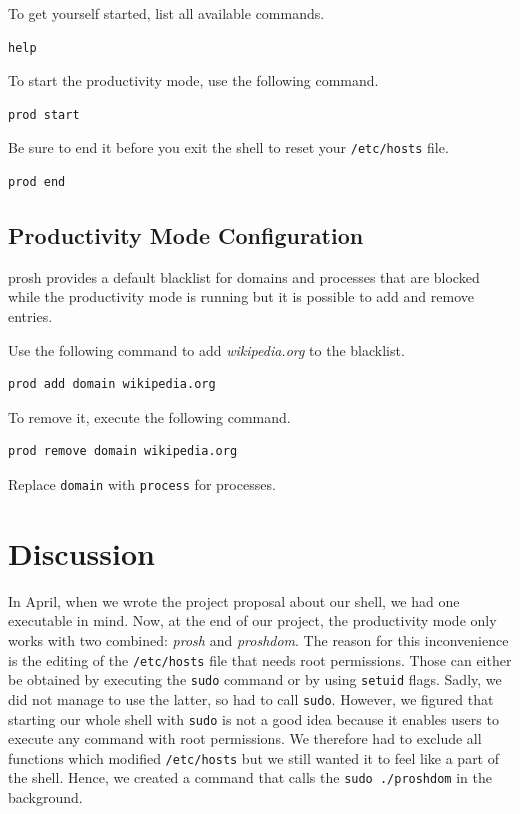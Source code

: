 \documentclass{article}
\begin{document}
To get yourself started, list all available commands.
\begin{lstlisting}[numbers=none]
help
\end{lstlisting}

To start the productivity mode, use the following command.
\begin{lstlisting}[numbers=none]
prod start
\end{lstlisting}

Be sure to end it before you exit the shell to reset your \texttt{/etc/hosts} file.
\begin{lstlisting}[numbers=none]
prod end
\end{lstlisting}

\subsection{Productivity Mode Configuration}

prosh provides a default blacklist for domains and processes that are blocked while the productivity mode is running but it is possible to add and remove entries.

Use the following command to add \textit{wikipedia.org} to the blacklist.
\begin{lstlisting}[numbers=none]
prod add domain wikipedia.org
\end{lstlisting}

To remove it, execute the following command.
\begin{lstlisting}[numbers=none]
prod remove domain wikipedia.org
\end{lstlisting}

Replace \texttt{domain} with \texttt{process} for processes.

\section{Discussion}

In April, when we wrote the project proposal about our shell, we had one executable in mind. Now, at the end of our project, the productivity mode only works with two combined: \textit{prosh} and \textit{proshdom}. The reason for this inconvenience is the editing of the \texttt{/etc/hosts} file that needs root permissions. Those can either be obtained by executing the  \texttt{sudo} command or by using \texttt{setuid} flags. Sadly, we did not manage to use the latter, so had to call \texttt{sudo}. However, we figured that starting our whole shell with \texttt{sudo} is not a good idea because it enables users to execute any command with root permissions. We therefore had to exclude all functions which modified \texttt{/etc/hosts} but we still wanted it to feel like a part of the shell. Hence, we created a command that calls the \texttt{sudo ./proshdom} in the background.
\end{document}
